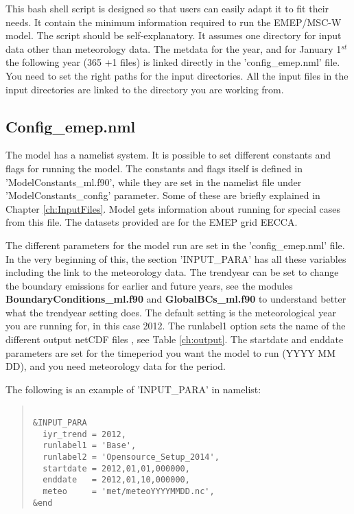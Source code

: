 This bash shell script is designed so that users can easily 
adapt it to fit their needs. It contain the minimum information 
required to run the EMEP/MSC-W model. 
The script should be self-explanatory. It assumes one directory for input data other than meteorology data. 
The metdata for the year, and for January 1$^{st}$ the following year (365 +1 files) is linked directly in the
'config\_emep.nml' file. 
You need to set the right paths 
for the input directories.  
All the input files in the input directories are linked to the directory you are working from. 

\subsection{Config\_emep.nml}

The model has a namelist system.  It is possible to set different constants and 
flags for running the model.  The constants and flags itself
is defined in 'ModelConstants\_ml.f90', while they are set in the namelist file under
'ModelConstants\_config' parameter. 
Some of these are briefly explained in Chapter \ref{ch:InputFiles}. 
 Model gets information about running for special cases from this 
file.  The datasets provided are for the EMEP grid EECCA. 

The different parameters for the model run are set in the 'config\_emep.nml' file.  In the very beginning 
of this, the section 'INPUT\_PARA' has all these variables including the link to the meteorology data. 
The trendyear can be set to change the boundary emissions for 
earlier and future years, see the modules {\bf BoundaryConditions\_ml.f90 } 
and {\bf GlobalBCs\_ml.f90 } to understand better what the trendyear 
setting does. The default setting is the meteorological year you are running for, in this case 2012. 
The runlabel1 option sets the name of the different output netCDF 
files , see Table \ref{ch:output}. 
The startdate and enddate parameters are set for the timeperiod you want the model 
to run (YYYY MM DD), and you need meteorology data for the period.

The following is an example of 'INPUT\_PARA' in namelist:

\begin{quote}
\begin{verbatim}

&INPUT_PARA
  iyr_trend = 2012,
  runlabel1 = 'Base',
  runlabel2 = 'Opensource_Setup_2014',
  startdate = 2012,01,01,000000,
  enddate   = 2012,01,10,000000,
  meteo     = 'met/meteoYYYYMMDD.nc',
&end

\end{verbatim}
\end{quote}
 
